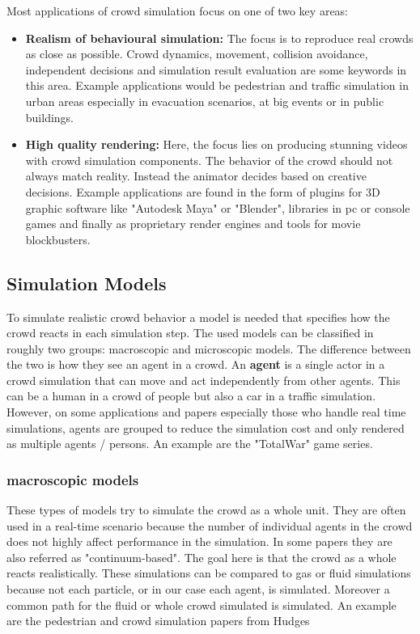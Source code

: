 \documentclass{acmsiggraph}               %
\begin{document}
Most applications of crowd simulation focus on one of two key areas: 
\begin{itemize}
\item \textbf{Realism of behavioural simulation:} The focus is to reproduce real crowds as close as possible. Crowd dynamics, movement, collision avoidance, independent decisions and simulation result evaluation are some keywords in this area. Example applications would be pedestrian and traffic simulation in urban areas especially in evacuation scenarios, at big events or in public buildings.
\item \textbf{High quality rendering:} Here, the focus lies on producing stunning videos with crowd simulation components. The behavior of the crowd should not always match reality. Instead the animator decides based on creative decisions. Example applications are found in the form of plugins for 3D graphic software like "Autodesk Maya" or "Blender", libraries in pc or console games and finally as proprietary render engines and tools for movie blockbusters.
\end{itemize}

\cite{thalmann_crowd_2013}

\subsection{Simulation Models}
\label{chap:simulationModels}
To simulate realistic crowd behavior a model is needed that specifies how the crowd reacts in each simulation step. The used models can be classified in roughly two groups: macroscopic and microscopic models. The difference between the two is how they see an agent in a crowd. An \textbf{agent} is a single actor in a crowd simulation that can move and act independently from other agents. This can be a human in a crowd of people but also a car in a traffic simulation. However, on some applications and papers especially those who handle real time simulations, agents are grouped to reduce the simulation cost and only rendered as multiple agents / persons. An example are the "TotalWar" \cite{total_war_website} game series.

\subsubsection{\textbf{macroscopic models}}
These types of models try to simulate the crowd as a whole unit. They are often used in a real-time scenario because the number of individual agents in the crowd does not highly affect performance in the simulation. In some papers they are also referred as "continuum-based"\cite{xu_crowd_2014}. The goal here is that the crowd as a whole reacts realistically. These simulations can be compared to gas or fluid simulations because not each particle, or in our case each agent, is simulated. Moreover a common path for the fluid or whole crowd simulated is simulated. An example are the pedestrian and crowd simulation papers from Hudges \cite{hughes_continuum_2002} \cite{hughes_flow_2003}
\end{document}
